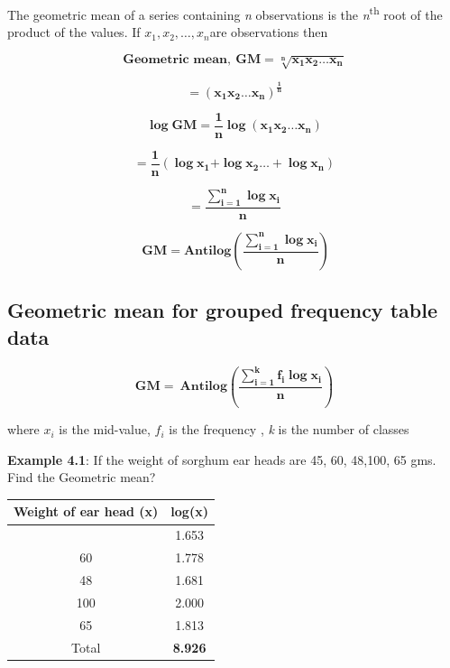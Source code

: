 \documentclass[
]{book}
\begin{document}
The geometric mean of a series containing \emph{n} observations is the
\emph{n}\textsuperscript{th} root of the product of the values. If
\(x_{1},x_{2},\ldots, x_{n}\)are observations then

\[\mathbf{\text{Geometric mean}}\mathbf{,\ }\mathbf{GM =}\sqrt[\mathbf{n}]{\mathbf{x}_{\mathbf{1}}\mathbf{x}_{\mathbf{2}}\mathbf{\ldots}\mathbf{x}_{\mathbf{n}}}\]

\[\mathbf{=}\left( \mathbf{x}_{\mathbf{1}}\mathbf{x}_{\mathbf{2}}\mathbf{\ldots}\mathbf{x}_{\mathbf{n}} \right)^{\frac{\mathbf{1}}{\mathbf{n}}}\]

\[\mathbf{\log}\mathbf{\text{GM}}\mathbf{=}\frac{\mathbf{1}}{\mathbf{n}}\mathbf{\log}\left( \mathbf{x}_{\mathbf{1}}\mathbf{x}_{\mathbf{2}}\mathbf{\ldots}\mathbf{x}_{\mathbf{n}} \right)\]

\[\mathbf{=}\frac{\mathbf{1}}{\mathbf{n}}\left( \mathbf{\log}\mathbf{x}_{\mathbf{1}}\mathbf{+}\mathbf{\log}\mathbf{x}_{\mathbf{2}}\mathbf{\ldots +}\mathbf{\log}\mathbf{x}_{\mathbf{n}} \right)\]

\[\mathbf{=}\frac{\sum_{\mathbf{i = 1}}^{\mathbf{n}}{\mathbf{\log}\mathbf{x}_{\mathbf{i}}}}{\mathbf{n}}\]

\[\mathbf{\ GM = Antilog}\left( \frac{\sum_{\mathbf{i = 1}}^{\mathbf{n}}{\mathbf{\log}\mathbf{x}_{\mathbf{i}}}}{\mathbf{n}} \right)\]

\subsection{Geometric mean for grouped frequency table data}\label{geometric-mean-for-grouped-frequency-table-data}

\[\mathbf{GM = \ Antilog}\left( \frac{\sum_{\mathbf{i = 1}}^{\mathbf{k}}{{\mathbf{f}_{\mathbf{i}}\mathbf{\log}}\mathbf{x}_{\mathbf{i}}}}{\mathbf{n}} \right)\]

where \(x_{i}\) is the mid-value, \(f_{i}\) is the frequency , \emph{k} is the
number of classes

\textbf{Example 4.1}: If the weight of sorghum ear heads are 45, 60, 48,100,
65 gms. Find the Geometric mean?

\begin{longtable}[]{@{}cc@{}}
\toprule\noalign{}
Weight of ear head (x) & log(x) \\
\midrule\noalign{}
\endhead
\bottomrule\noalign{}
\endlastfoot
45 & 1.653 \\
60 & 1.778 \\
48 & 1.681 \\
100 & 2.000 \\
65 & 1.813 \\
Total & \textbf{8.926} \\
\end{longtable}
\end{document}
